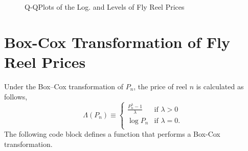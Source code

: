 \begin{figure}[!ht]
\hfill
{}

\caption{Q-QPlots of the Log. and Levels of Fly Reel Prices}
\label{fig:qq_prices}
\end{figure}





\pagebreak
\section{Box-Cox Transformation of Fly Reel Prices}

Under the Box--Cox transformation of $P_n$, the price of reel $n$
is calculated as follows,
$$\Lambda(P_n)\equiv
  \begin{cases}
	\frac{P_n^\lambda-1}{\lambda}	& \textrm{if } \lambda > 0 \\
           \log P_n                     			& \textrm{if } \lambda = 0.\\
  \end{cases}
$$
The following code block defines a function that performs a
Box-Cox transformation.

